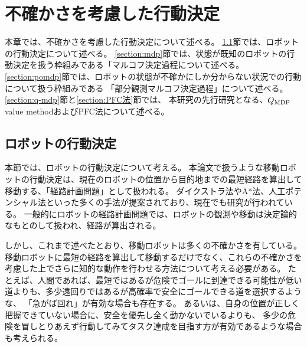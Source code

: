 \chapter{不確かさを考慮した行動決定} \label{chapter:pomdp}

本章では、不確かさを考慮した行動決定について述べる。
\ref{section:ロボットの行動決定}節では、ロボットの行動決定について述べる。
\ref{section:mdp}節では、状態が既知のロボットの行動決定を扱う枠組みである「マルコフ決定過程について述べる。
\ref{section:pomdp}節では、ロボットの状態が不確かにしか分からない状況での行動について扱う枠組みである
「部分観測マルコフ決定過程」について述べる。
\ref{section:q-mdp}節と\ref{section:PFC法}節では、
本研究の先行研究となる、$Q_{\rm MDP}$ value methodおよびPFC法について述べる。



\section{ロボットの行動決定} \label{section:ロボットの行動決定}
本節では、ロボットの行動決定について考える。
本論文で扱うような移動ロボットの行動決定は、現在のロボットの位置から目的地までの最短経路を算出して移動する、「経路計画問題」として扱われる。
ダイクストラ法やA*法、人工ポテンシャル法といった多くの手法が提案されており、現在でも研究が行われている。
一般的にロボットの経路計画問題では、ロボットの観測や移動は決定論的なもとのして扱われ、経路が算出される。

しかし、これまで述べたとおり、移動ロボットは多くの不確かさを有している。
移動ロボットに最短の経路を算出して移動するだけでなく、これらの不確かさを考慮した上でさらに知的な動作を行わせる方法について考える必要がある。
たとえば、人間であれば、最短ではあるが危険でゴールに到達できる可能性が低い道よりも、多少遠回りではあるが高確率で安全にゴールできる道を選択するような、
「急がば回れ」が有効な場合も存在する。
あるいは、自身の位置が正しく把握できていない場合に、安全を優先し全く動かないでいるよりも、
多少の危険を冒しとりあえず行動してみてタスク達成を目指す方が有効であるような場合も考えられる。

